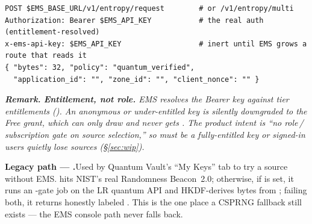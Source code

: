 \documentclass[11pt]{article}
\newenvironment{remark}
  {\par\medskip\noindent\small\itshape\textbf{\upshape Remark.}\hspace{0.4em}\ignorespaces}
  {\par\medskip}
\begin{document}
\begin{lstlisting}[caption={server route to EMS egress (from src/app/api/ems/entropy/route.ts)},captionpos=b]
POST $EMS_BASE_URL/v1/entropy/request        # or /v1/entropy/multi
Authorization: Bearer $EMS_API_KEY           # the real auth (entitlement-resolved)
x-ems-api-key: $EMS_API_KEY                  # inert until EMS grows a route that reads it
{ "bytes": 32, "policy": "quantum_verified",
  "application_id": "", "zone_id": "", "client_nonce": "" }
\end{lstlisting}

\begin{remark}
\textbf{\upshape Entitlement, not role.} EMS resolves the Bearer key against tier entitlements
(). An \emph{anonymous} or under-entitled key is silently downgraded to the Free
grant, which can only draw  and never gets . The product intent is ``no
role\,/\,subscription gate on source selection,'' so  must be a fully-entitled key or signed-in users
quietly lose sources (\S\ref{sec:wip}).
\end{remark}

\noindent\textbf{Legacy path --- .}\enspace Used by Quantum Vault's ``My Keys'' tab
to try a source without EMS.  hits NIST's real Randomness Beacon~2.0; otherwise, if  is set,
it runs an -gate job on the LR quantum API and HKDF-derives bytes from ; failing both, it
returns  honestly labeled . This is the one place a CSPRNG fallback
still exists --- the EMS console path never falls back.
\end{document}
